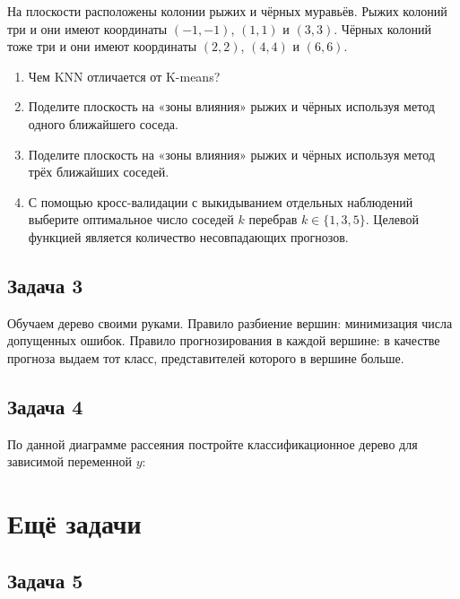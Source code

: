 \documentclass[12pt, a4paper, oneside]{article}
\begin{document}
На плоскости расположены колонии рыжих и чёрных муравьёв. Рыжих колоний три и они имеют координаты $(-1, -1)$, $(1, 1)$ и $(3, 3)$. Чёрных колоний тоже три и они имеют координаты $(2, 2)$, $(4, 4)$ и $(6, 6)$.

\begin{enumerate}
	\item Чем KNN отличается от K-means? 
	\item Поделите плоскость на «зоны влияния» рыжих и чёрных используя метод одного ближайшего соседа.
	\item Поделите плоскость на «зоны влияния» рыжих и чёрных используя метод трёх ближайших соседей.
	\item С помощью кросс-валидации с выкидыванием отдельных наблюдений выберите оптимальное число соседей $k$ перебрав $k \in \{1, 3, 5\}$. Целевой функцией является количество несовпадающих прогнозов.
\end{enumerate}

\subsection*{Задача 3}

Обучаем дерево своими руками. Правило разбиение вершин: минимизация числа допущенных ошибок. Правило прогнозирования в каждой вершине: в качестве прогноза выдаем тот класс, представителей которого в вершине больше. 



\subsection*{Задача 4}

По данной диаграмме рассеяния постройте классификационное дерево для зависимой переменной $y$:

	\begin{center}
		\begin{tikzpicture}[scale = 0.015]
		
		\end{tikzpicture}
	\end{center}


\section{Ещё задачи} 

\subsection*{Задача 5} 
\end{document}
